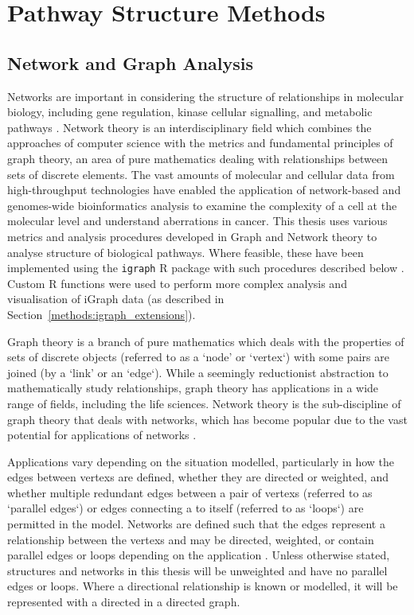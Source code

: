 \section{Pathway Structure Methods}

\subsection{Network and Graph Analysis}

Networks are important in considering the structure of relationships in molecular biology, including gene regulation, kinase cellular signalling, and metabolic \glspl{pathway} \citep{Barabasi2004}. Network theory is an interdisciplinary field which combines the approaches of computer science with the metrics and fundamental principles of graph theory, an area of pure mathematics dealing with relationships between sets of discrete elements. The vast amounts of molecular and cellular data from high-throughput technologies have enabled the application of network-based and \glspl{genome}-wide \gls{bioinformatics} analysis to examine the complexity of a cell at the molecular level and understand aberrations in cancer. This thesis uses various metrics and analysis procedures developed in Graph and Network theory to analyse  structure of biological \glspl{pathway}. Where feasible, these have been implemented using the \texttt{igraph} R package with such procedures described below \citep{igraph}. Custom R functions were used to perform more complex analysis and visualisation of iGraph data (as described in Section~\ref{methods:igraph_extensions}).

Graph theory is a branch of pure mathematics which deals with the properties of sets of discrete objects (referred to as a `node' or `vertex`) with some pairs are joined (by a `link' or an `edge`). While a seemingly reductionist abstraction to mathematically study relationships, graph theory has applications in a wide range of fields, including the life sciences. Network theory is the sub-discipline of graph theory that deals with networks, which has become popular due to the vast potential for applications of networks \citep{vanSteen2010}. 

Applications vary depending on the situation modelled, particularly in how the \glspl{edge} between \glspl{vertex} are defined, whether they are directed or weighted, and whether multiple redundant \glspl{edge} between a pair of \glspl{vertex} (referred to as `parallel \glspl{edge}`) or \glspl{edge} connecting a  to itself (referred to as `loops`) are permitted in the model. Networks are defined such that the \glspl{edge} represent a relationship between the \glspl{vertex} and may be directed, weighted, or contain parallel \glspl{edge} or loops depending on the application \citep{vanSteen2010}. Unless otherwise stated,  structures and networks in this thesis will be unweighted and have no parallel \glspl{edge} or loops. Where a directional relationship is known or modelled, it will be represented with a directed  in a directed graph.

